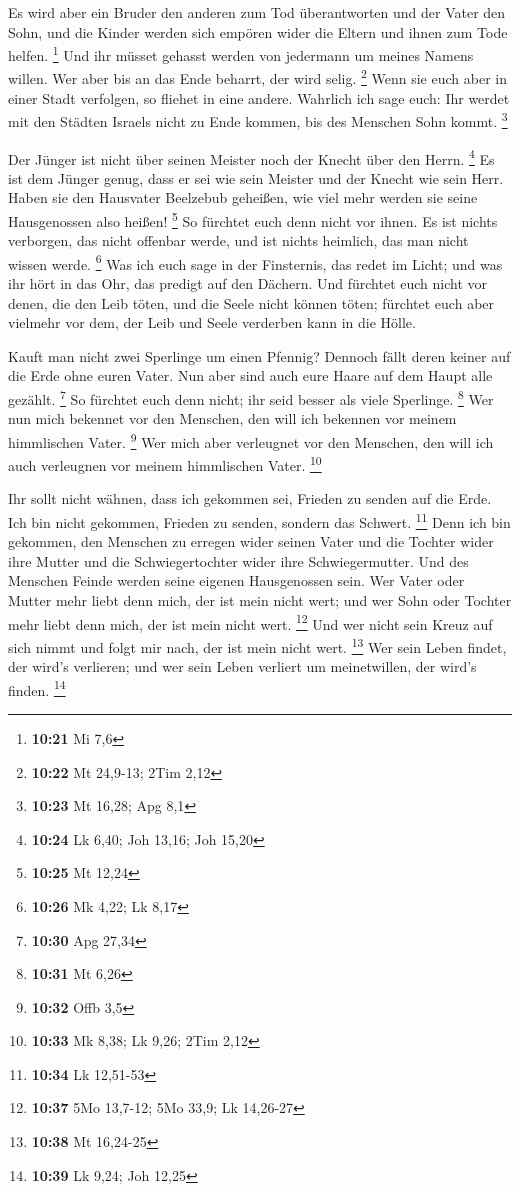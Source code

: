  Es wird aber ein Bruder den anderen zum Tod
überantworten und der Vater den Sohn, und die Kinder werden sich empören
wider die Eltern und ihnen zum Tode helfen. \footnote{\textbf{10:21} Mi
  7,6}  Und ihr müsset gehasst werden von jedermann um
meines Namens willen. Wer aber bis an das Ende beharrt, der wird selig.
\footnote{\textbf{10:22} Mt 24,9-13; 2Tim 2,12}  Wenn sie
euch aber in einer Stadt verfolgen, so fliehet in eine andere. Wahrlich
ich sage euch: Ihr werdet mit den Städten Israels nicht zu Ende kommen,
bis des Menschen Sohn kommt. \footnote{\textbf{10:23} Mt 16,28; Apg 8,1}

 Der Jünger ist nicht über seinen Meister noch der Knecht
über den Herrn. \footnote{\textbf{10:24} Lk 6,40; Joh 13,16; Joh 15,20}
 Es ist dem Jünger genug, dass er sei wie sein Meister
und der Knecht wie sein Herr. Haben sie den Hausvater Beelzebub
geheißen, wie viel mehr werden sie seine Hausgenossen also heißen!
\footnote{\textbf{10:25} Mt 12,24}  So fürchtet euch denn
nicht vor ihnen. Es ist nichts verborgen, das nicht offenbar werde, und
ist nichts heimlich, das man nicht wissen werde. \footnote{\textbf{10:26}
  Mk 4,22; Lk 8,17}  Was ich euch sage in der Finsternis,
das redet im Licht; und was ihr hört in das Ohr, das predigt auf den
Dächern.  Und fürchtet euch nicht vor denen, die den Leib
töten, und die Seele nicht können töten; fürchtet euch aber vielmehr vor
dem, der Leib und Seele verderben kann in die Hölle.

 Kauft man nicht zwei Sperlinge um einen Pfennig? Dennoch
fällt deren keiner auf die Erde ohne euren Vater.  Nun
aber sind auch eure Haare auf dem Haupt alle gezählt. \footnote{\textbf{10:30}
  Apg 27,34}  So fürchtet euch denn nicht; ihr seid
besser als viele Sperlinge. \footnote{\textbf{10:31} Mt 6,26}
 Wer nun mich bekennet vor den Menschen, den will ich
bekennen vor meinem himmlischen Vater. \footnote{\textbf{10:32} Offb 3,5}
 Wer mich aber verleugnet vor den Menschen, den will ich
auch verleugnen vor meinem himmlischen Vater. \footnote{\textbf{10:33}
  Mk 8,38; Lk 9,26; 2Tim 2,12}

 Ihr sollt nicht wähnen, dass ich gekommen sei, Frieden
zu senden auf die Erde. Ich bin nicht gekommen, Frieden zu senden,
sondern das Schwert. \footnote{\textbf{10:34} Lk 12,51-53}
 Denn ich bin gekommen, den Menschen zu erregen wider
seinen Vater und die Tochter wider ihre Mutter und die Schwiegertochter
wider ihre Schwiegermutter.  Und des Menschen Feinde
werden seine eigenen Hausgenossen sein.  Wer Vater oder
Mutter mehr liebt denn mich, der ist mein nicht wert; und wer Sohn oder
Tochter mehr liebt denn mich, der ist mein nicht wert. \footnote{\textbf{10:37}
  5Mo 13,7-12; 5Mo 33,9; Lk 14,26-27}  Und wer nicht sein
Kreuz auf sich nimmt und folgt mir nach, der ist mein nicht wert.
\footnote{\textbf{10:38} Mt 16,24-25}  Wer sein Leben
findet, der wird's verlieren; und wer sein Leben verliert um
meinetwillen, der wird's finden. \footnote{\textbf{10:39} Lk 9,24; Joh
  12,25}

